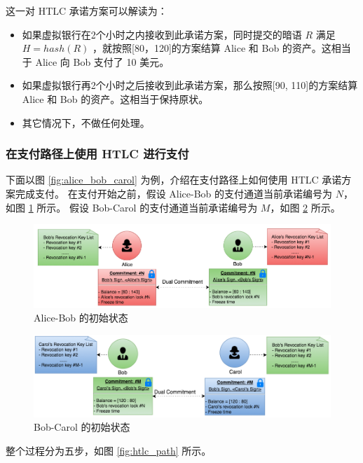 这一对 HTLC 承诺方案可以解读为：

\begin{itemize}
    \item 如果虚拟银行在2个小时之内接收到此承诺方案，同时提交的暗语 $R$ 满足 $H = hash(R)$ ，就按照[80，120]的方案结算 Alice 和 Bob 的资产。这相当于 Alice 向 Bob 支付了 10 美元。
    \item 如果虚拟银行再2个小时之后接收到此承诺方案，那么按照[90, 110]的方案结算 Alice 和 Bob 的资产。这相当于保持原状。
    \item 其它情况下，不做任何处理。
\end{itemize}


\subsubsection{在支付路径上使用 HTLC 进行支付} \label{sec:htlc_pay}
下面以图 \ref{fig:alice_bob_carol} 为例，介绍在支付路径上如何使用 HTLC 承诺方案完成支付。
在支付开始之前，假设 Alice-Bob 的支付通道当前承诺编号为 $N$，如图 \ref{fig:htlc_alice_bob_1} 所示。
假设 Bob-Carol 的支付通道当前承诺编号为 $M$，如图 \ref{fig:htlc_bob_carol_1} 所示。

\begin{figure}[h!]
    \centering
    \includegraphics[width=12cm, keepaspectratio]{../images/alice_bob_1.png}
    \caption{Alice-Bob 的初始状态}
    \label{fig:htlc_alice_bob_1}
\end{figure}

\begin{figure}[h!]
    \centering
    \includegraphics[width=12cm, keepaspectratio]{../images/bob_carol_1.png}
    \caption{Bob-Carol 的初始状态}
    \label{fig:htlc_bob_carol_1}
\end{figure}

\newpage
整个过程分为五步，如图 \ref{fig:htlc_path} 所示。

